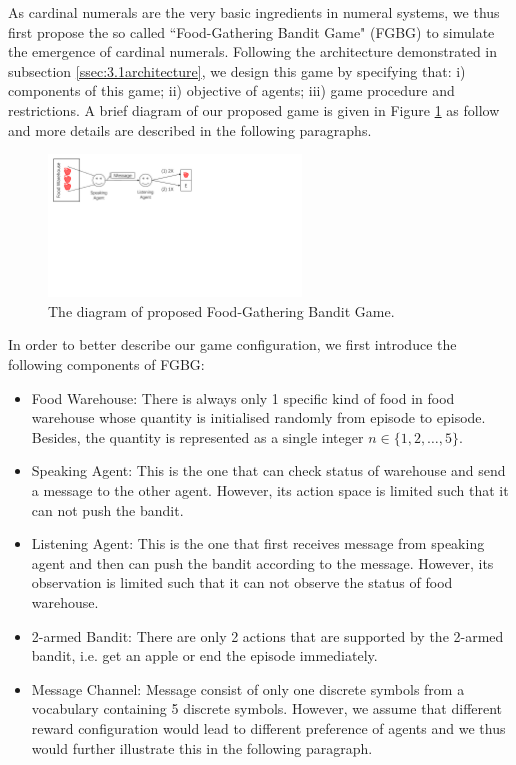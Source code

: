 \documentclass[a4paper,11pt]{article}
\begin{document}
As cardinal numerals are the very basic ingredients in numeral systems, we thus first propose the so called ``Food-Gathering Bandit Game" (FGBG) to simulate the emergence of cardinal numerals. Following the architecture demonstrated in subsection \ref{ssec:3.1architecture}, we design this game by specifying that: i) components of this game; ii) objective of agents; iii) game procedure and restrictions. A brief diagram of our proposed game is given in Figure \ref{fig:game1} as follow and more details are described in the following paragraphs.

\begin{figure}[!h]
  \centering
  \includegraphics[width=0.6\textwidth]{Diagram.pdf}
  \caption{The diagram of proposed Food-Gathering Bandit Game.}\label{fig:game1}
\end{figure}

In order to better describe our game configuration, we first introduce the following components of FGBG:

\begin{itemize}
  \item Food Warehouse: There is always only 1 specific kind of food in food warehouse whose quantity is initialised randomly from episode to episode. Besides, the quantity is represented as a single integer $n\in \{1, 2, \dots, 5\}$.
  \item Speaking Agent: This is the one that can check status of warehouse and send a message to the other agent. However, its action space is limited such that it can not push the bandit.
  \item Listening Agent: This is the one that first receives message from speaking agent and then can push the bandit according to the message. However, its observation is limited such that it can not observe the status of food warehouse.
  \item 2-armed Bandit: There are only 2 actions that are supported by the 2-armed bandit, i.e. get an apple or end the episode immediately.
  \item Message Channel: Message consist of only one discrete symbols from a vocabulary containing 5 discrete symbols. However, we assume that different reward configuration would lead to different preference of agents and we thus would further illustrate this in the following paragraph.
\end{itemize}
\end{document}
